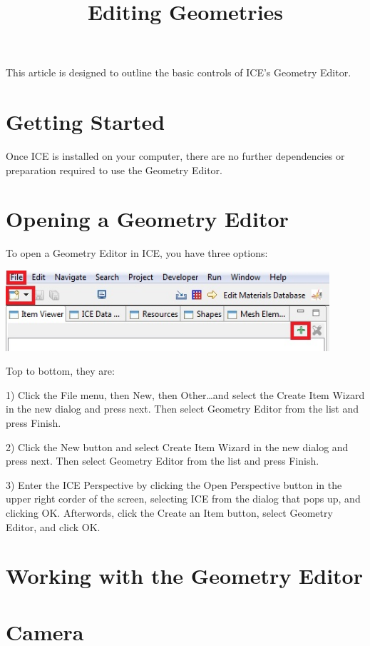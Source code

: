 \documentclass{article}
\begin{document}
 
\title{Editing Geometries}

This article is designed to outline the basic controls of ICE's Geometry Editor.

\section{Getting Started}

Once ICE is installed on your computer, there are no further dependencies or
preparation required to use the Geometry Editor.

\section{Opening a Geometry Editor}

To open a Geometry Editor in ICE, you have three options:

\begin{center}
\includegraphics[width=12cm]{images/CreateNewGeometryOptions.jpg}
\end{center}

Top to bottom, they are:

1) Click the File menu, then New, then Other\ldots and select the Create Item
Wizard in the new dialog and press next. Then select Geometry Editor from the
list and press Finish.

 
2) Click the New button and select Create Item Wizard in the new dialog and
press next. Then select Geometry Editor from the list and press Finish.


3) Enter the ICE Perspective by clicking the Open Perspective button in the
upper right corder of the screen, selecting ICE from the dialog that pops up,
and clicking OK. Afterwords, click the Create an Item button, select
Geometry Editor, and click OK.

\section{Working with the Geometry Editor}

\section{Camera}
\end{document}
